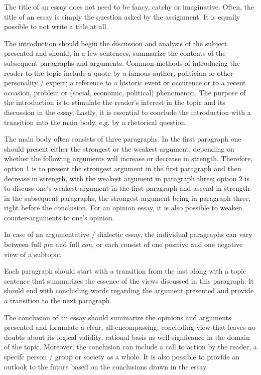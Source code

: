 \begin{enumerate}


	The title of an essay does not need to be fancy, catchy or imaginative. Often, the title of an essay is simply the question asked by the assignment. It is equally possible to not write a title at all.


	The introduction should begin the discussion and analysis of the subject presented and should, in a few sentences, summarize the contents of the subsequent paragraphs and arguments. Common methods of introducing the reader to the topic include a quote by a famous author, politician or other personality / expert; a reference to a historic event or occurence or to a recent occasion, problem or (social, economic, political) phenomenon. The purpose of the introduction is to stimulate the reader's interest in the topic and its discussion in the essay. Lastly, it is essential to conclude the introduction with a transition into the main body, e.g. by a rhetorical question.


	The main body often consists of three paragraphs. In the first paragraph one should present either the strongest or the weakest argument, depending on whether the following arguments will increase or decrease in strength. Therefore, option 1 is to present the strongest argument in the first paragraph and then decrease in strength, with the weakest argument in paragraph three; option 2 is to discuss one's weakest argument in the first paragraph and ascend in strength in the subsequent paragraphs, the strongest argument being in paragraph three, right before the conclusion. For an opinion essay, it is also possible to weaken counter-arguments to one's opinion.

	\extrapar

	In case of an argumentative / dialectic essay, the individual paragraphs can vary between full \emph{pro} and full \emph{con}, or each consist of one positive and one negative view of a subtopic. 

	\extrapar

	Each paragraph should start with a transition from the last along with a topic sentence that summarizes the essence of the views discussed in this paragraph. It should end with concluding words regarding the argument presented and provide a transition to the next paragraph.

\pagebreak


	The conclusion of an essay should summarize the opinions and arguments presented and formulate a clear, all-encompassing, concluding view that leaves no doubts about its logical validity, rational basis as well signficance in the domain of the topic. Moreover, the conclusion can include a call to action by the reader, a specifc person / group or society as a whole. It is also possible to provide an outlook to the future based on the conclusions drawn in the essay.

\end{enumerate}

